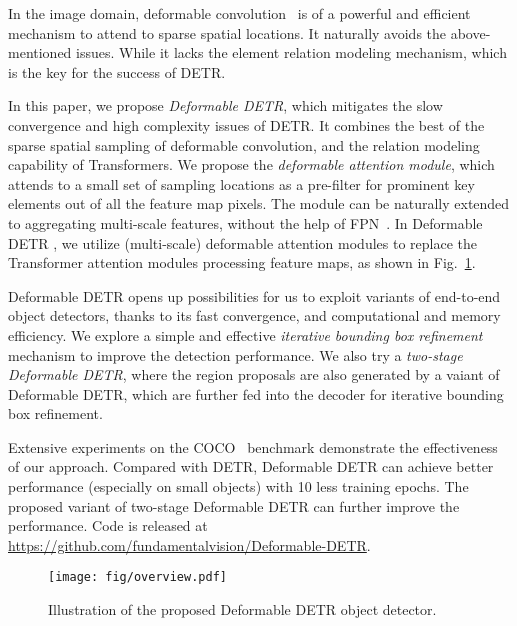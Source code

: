 \documentclass{article}
\begin{document}
In the image domain, deformable convolution~\citep{dai2017deformable} is of a powerful and efficient mechanism to attend to sparse spatial locations. It naturally avoids the above-mentioned issues. While it lacks the element relation modeling mechanism, which is the key for the success of DETR.


In this paper, we propose \emph{Deformable DETR}, which mitigates the slow convergence and high complexity issues of DETR. It combines the best of the sparse spatial sampling of deformable convolution, and the relation modeling capability of Transformers. We propose the \emph{deformable attention module}, which attends to a small set of sampling locations as a pre-filter for prominent key elements out of all the feature map pixels.
The module can be naturally extended to aggregating multi-scale features, without the help of FPN~\citep{lin2017feature}. In Deformable DETR , we utilize (multi-scale) deformable attention modules to replace the Transformer attention modules processing feature maps, as shown in Fig.~\ref{fig:attention_demo}. 



Deformable DETR opens up possibilities for us to exploit variants of end-to-end object detectors, thanks to its fast convergence, and computational and memory efficiency. We explore a simple and effective \textit{iterative bounding box refinement} mechanism to improve the detection performance. We also try a \textit{two-stage Deformable DETR}, where the region proposals are also generated by a vaiant of Deformable DETR, which are further fed into the decoder for iterative bounding box refinement.

Extensive experiments on the COCO~\citep{lin2014microsoft} benchmark demonstrate the effectiveness of our approach. Compared with DETR, Deformable DETR can achieve better performance (especially on small objects) with 10 less training epochs. 
The proposed variant of two-stage Deformable DETR can further improve the performance.
Code is released at \url{https://github.com/fundamentalvision/Deformable-DETR}.


\begin{figure}[t]
\begin{center}
  \texttt{[image: fig/overview.pdf]}
\end{center}
\vspace{-0.5em}
\caption{Illustration of the proposed Deformable DETR object detector.}
\vspace{-0.5em}
\label{fig:attention_demo}
\end{figure}
\end{document}
